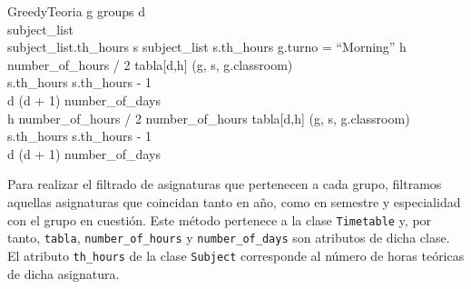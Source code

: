 \begin{pseudocode}{GreedyTeoria}{ }
    \label{greedyteoria}
    \FOREACH g \in groups \DO
    \BEGIN
        d  \\
        subject\_list \GETS {}\\
        \WHILE \sum subject\_list.th\_hours  \DO
        \BEGIN
            \FOREACH s \in subject_list \DO
            \BEGIN
                \IF s.th\_hours  \DO
                \BEGIN
                    \IF g.turno = ``Morning'' \DO
                    \BEGIN
                        \FOR h  \TO number\_of\_hours / 2 \DO
                        \BEGIN
                            \IF {} \DO
                            \BEGIN
                                tabla[d,h] \GETS (g, s, g.classroom)\\
                                s.th\_hours \GETS s.th\_hours - 1\\
                                d \GETS (d + 1) \bmod number\_of\_days\\
                                \BREAK
                            \END
                        \END
                    \END
                    \ELSE \DO
                    \BEGIN
                        \FOR h \GETS number\_of\_hours / 2 \TO number\_of\_hours \DO
                        \BEGIN
                            \IF {} \DO
                            \BEGIN
                                tabla[d,h] \GETS (g, s, g.classroom)\\
                                s.th\_hours \GETS s.th\_hours - 1\\
                                d \GETS (d + 1) \bmod number\_of\_days\\
                                \BREAK
                            \END
                        \END
                    \END
                \END
            \END
        \END
    \END
\end{pseudocode}

Para realizar el filtrado de asignaturas que pertenecen a cada grupo, filtramos aquellas asignaturas que coincidan tanto en año, como en semestre y especialidad con el grupo en cuestión. Este método pertenece a la clase \texttt{Timetable} y, por tanto, \texttt{tabla}, \texttt{number\_of\_hours} y \texttt{number\_of\_days} son atributos de dicha clase. El atributo \texttt{th\_hours} de la clase \texttt{Subject} corresponde al número de horas teóricas de dicha asignatura.

